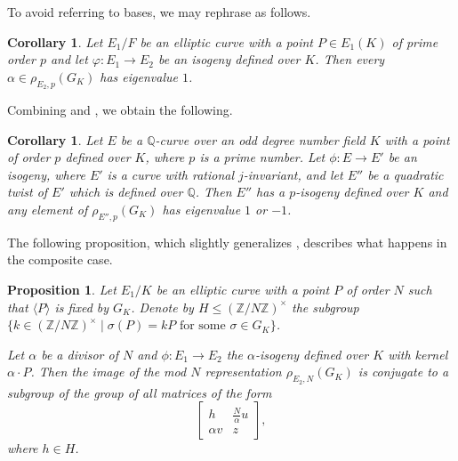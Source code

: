 \documentclass[10pt,leqno]{amsart}
\newcommand\m[1]{\begin{bmatrix}#1\end{bmatrix}}
\newcommand{\Z}{\mathbb{Z}}
\newcommand{\Q}{\mathbb{Q}}
\newtheorem{proposition}[theorem]{Proposition}
\newtheorem{corollary}[theorem]{Corollary}
\theoremstyle{definition}
\theoremstyle{remark}
\numberwithin{theorem}{section}
\begin{document}
To avoid referring to bases, we may rephrase  as follows.

\begin{corollary}\label{eigen1}
     Let $E_1/F$ be an elliptic curve with a point $P \in E_1(K)$ of prime order $p$ and let $\varphi: E_1 \to E_2$ be an isogeny defined over $K$. Then every $\alpha \in \rho_{E_2, p}(G_K)$ has eigenvalue $1$.
\end{corollary}

Combining   and , we obtain the following. 

\begin{corollary}\label{izogenija i eigen+-1}
    Let $E$ be a $\Q$-curve over an odd degree number field $K$ with a point of order $p$ defined over $K$, where $p$ is a prime number. Let $\phi:E\to E'$ be an isogeny, where $E'$ is a curve with rational $j$-invariant, and let $E''$ be a quadratic twist of $E'$ which is defined over $\Q$. Then $E''$ has a $p$-isogeny defined over $K$ and any element of $\rho_{E'',p}(G_K)$ has eigenvalue $1$ or $-1$.
\end{corollary}

The following proposition, which slightly generalizes \cite[Proposition 4.4.]{bourdon-najman},  describes what happens in the composite case.


\begin{proposition}\label{izogenije-generalno}
    Let $E_1/K$ be an elliptic curve with a point $P$ of order $N$ such that $\langle P \rangle$ is fixed by $G_K$. Denote by $H \leq (\Z /N\Z)^\times$ the subgroup $\{k \in (\Z/N\Z)^\times \mid \sigma(P)=kP \text{ for some } \sigma \in G_K\}$. 
    
    Let $\alpha$ be a divisor of $N$ and $\phi:E_1 \to E_2$ the  $\alpha$-isogeny defined over $K$ with kernel $\alpha\cdot P$. Then the image of the mod $N$ representation $\rho_{E_2, N}(G_K)$ is conjugate to a subgroup of the group of all matrices of the form $$\m{ h & \frac{N}{\alpha}u \\ \alpha v & z},$$ where $h \in H$.
\end{proposition}
\end{document}
